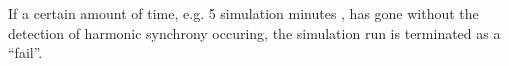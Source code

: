 
	
	If a certain amount of time, e.g. 5 simulation minutes \cite{nymoen_synch}, has gone without the detection of harmonic synchrony occuring, the simulation run is terminated as a ``fail''.


